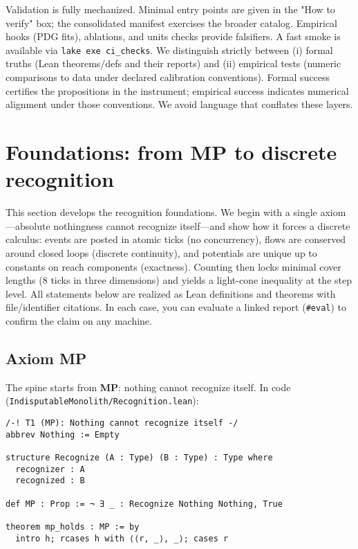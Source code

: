\documentclass[11pt,a4paper,twoside]{article}
\numberwithin{equation}{section}
\theoremstyle{customthm}
\theoremstyle{customdef}
\theoremstyle{customrem}
\begin{document}
Validation is fully mechanized. Minimal entry points are given in the "How to verify" box; the consolidated manifest exercises the broader catalog. Empirical hooks (PDG fits), ablations, and units checks provide falsifiers. A fast smoke is available via \texttt{lake exe ci\_checks}. We distinguish strictly between (i) formal truths (Lean theorems/defs and their reports) and (ii) empirical tests (numeric comparisons to data under declared calibration conventions). Formal success certifies the propositions in the instrument; empirical success indicates numerical alignment under those conventions. We avoid language that conflates these layers.

\section{Foundations: from MP to discrete recognition}\label{sec:foundations}

This section develops the recognition foundations. We begin with a single axiom—absolute nothingness cannot recognize itself—and show how it forces a discrete calculus: events are posted in atomic ticks (no concurrency), flows are conserved around closed loops (discrete continuity), and potentials are unique up to constants on reach components (exactness). Counting then locks minimal cover lengths (8 ticks in three dimensions) and yields a light-cone inequality at the step level. All statements below are realized as Lean definitions and theorems with file/identifier citations. In each case, you can evaluate a linked report (\texttt{\#eval}) to confirm the claim on any machine.

\subsection{Axiom MP}

\noindent The spine starts from \textbf{MP}: nothing cannot recognize itself. In code (\texttt{IndisputableMonolith/Recognition.lean}):

\begin{lstlisting}
/-! T1 (MP): Nothing cannot recognize itself -/
abbrev Nothing := Empty

structure Recognize (A : Type) (B : Type) : Type where
  recognizer : A
  recognized : B

def MP : Prop := ¬ ∃ _ : Recognize Nothing Nothing, True

theorem mp_holds : MP := by
  intro h; rcases h with ⟨⟨r, _⟩, _⟩; cases r
\end{lstlisting}
\end{document}
